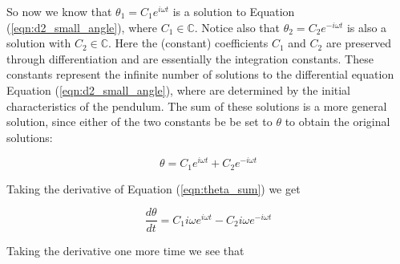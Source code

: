\documentclass{article}
\theoremstyle{definition}
\begin{document}
\bigskip
\noindent
So now we know that $\theta_1 = C_1 e^{i \omega t}$ is a solution
to Equation (\ref{eqn:d2_small_angle}), where $C_1 \in
\mathbb{C}$. Notice also that $\theta_2 = C_2 e^{-i \omega t}$ is
also a solution with $C_2 \in \mathbb{C}$. Here the (constant)
coefficients $C_1$ and $C_2$ are preserved through
differentiation and are essentially the integration constants.
These constants represent the infinite number of solutions to the
differential equation Equation (\ref{eqn:d2_small_angle}), where
are determined by the initial characteristics of the
pendulum. The sum of these solutions is a more general solution,
since either of the two constants be be set to $\theta$ to obtain
the original solutions:


\begin{equation}
\theta = C_1 e^{i \omega t} + C_2 e^{-i \omega t}
\label{eqn:theta_sum}
\end{equation}

\bigskip
\noindent
Taking the derivative of Equation (\ref{eqn:theta_sum}) we get

\medskip
\begin{equation}
\dfrac{d \theta}{dt} = C_1 i \omega e^{i \omega t} - C_2 i \omega e^{-i \omega t}
\label{eqn:dtheta_dt}
\end{equation}

\bigskip
\noindent
Taking the derivative one more time we see that  
\end{document}
